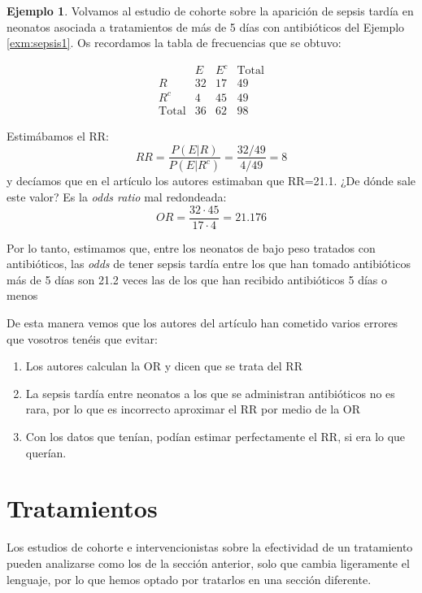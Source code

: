 \documentclass[
]{book}
\providecommand{\tightlist}{%
  \setlength{\itemsep}{0pt}\setlength{\parskip}{0pt}}
\theoremstyle{definition}
\theoremstyle{definition}
\newtheorem{example}{Ejemplo}[chapter]
\theoremstyle{definition}
\theoremstyle{definition}
\theoremstyle{remark}
\begin{document}
\begin{example}
\protect\hypertarget{exm:sepsis3}{}\label{exm:sepsis3}Volvamos al estudio de cohorte sobre la aparición de sepsis tardía en neonatos asociada a tratamientos de más de 5 días con antibióticos del Ejemplo \ref{exm:sepsis1}. Os recordamos la tabla de frecuencias que se obtuvo:
\end{example}

\[
\begin{array}{c|cc|c}
 & E & E^c & \text{Total}\\ \hline
R & 32 & 17 & 49   \\ 
R^c & 4 & 45 & 49\\ \hline
\text{Total} & 36 & 62 & 98
\end{array}
\]

Estimábamos el RR:
\[
RR=\frac{P(E|R)}{P(E|R^c)}=\frac{32/49}{4/49}=8
\]
y decíamos que en el artículo los autores estimaban que RR=21.1. ¿De dónde sale este valor? Es la \emph{odds ratio} mal redondeada:
\[
OR= \dfrac{32\cdot 45}{17\cdot 4}=21.176
\]

Por lo tanto, estimamos que, entre los neonatos de bajo peso tratados con antibióticos, las \emph{odds} de tener sepsis tardía entre los que han tomado antibióticos más de 5 días son 21.2 veces las de los que han recibido antibióticos 5 días o menos

De esta manera vemos que los autores del artículo han cometido varios errores que vosotros tenéis que evitar:

\begin{enumerate}
\def\labelenumi{\arabic{enumi}.}
\tightlist
\item
  Los autores calculan la OR y dicen que se trata del RR
\item
  La sepsis tardía entre neonatos a los que se administran antibióticos no es rara, por lo que es incorrecto aproximar el RR por medio de la OR
\item
  Con los datos que tenían, podían estimar perfectamente el RR, si era lo que querían.
\end{enumerate}

\hypertarget{tratamientos}{%
\section{Tratamientos}\label{tratamientos}}

Los estudios de cohorte e intervencionistas sobre la efectividad de un tratamiento pueden analizarse como los de la sección anterior, solo que cambia ligeramente el lenguaje, por lo que hemos optado por tratarlos en una sección diferente.
\end{document}
